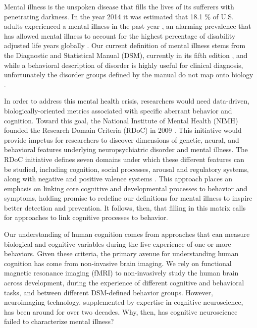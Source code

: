 \documentclass{report}
\begin{document}

Mental illness is the unspoken disease that fills the lives of its sufferers with penetrating darkness. In the year 2014 it was estimated that 18.1 \% of U.S. adults experienced a mental illness in the past year \cite{Samhsa_undated-fo}, an alarming prevalence that has allowed mental illness to account for the highest percentage of disability adjusted life years globally \cite{noauthor_2010-wr}. Our current definition of mental illness stems from the Diagnostic and Statistical Manual (DSM), currently in its fifth edition \cite{american2013diagnostic}, and while a behavioral description of disorder is highly useful for clinical diagnosis, unfortunately the disorder groups defined by the manual do not map onto biology \cite{Cuthbert2013-ks}.

In order to address this mental health crisis, researchers would need data-driven, biologically-oriented metrics associated with specific aberrant behavior and cognition. Toward this goal, the National Institute of Mental Health (NIMH) founded the Research Domain Criteria (RDoC) in 2009 \cite{Insel2009-vi}. This initiative would provide impetus for researchers to discover dimensions of genetic, neural, and behavioral features underlying neuropsychiatric disorder and mental illness. The RDoC initiative defines seven domains under which these different features can be studied, including cognition, social processes, arousal and regulatory systems, along with negative and positive valence systems \cite{Morris2012-hx}. This approach places an emphasis on linking core cognitive and developmental processes to behavior and symptoms, holding promise to redefine our definitions for mental illness to inspire better detection and prevention. It follows, then, that filling in this matrix calls for approaches to link cognitive processes to behavior.

Our understanding of human cognition comes from approaches that can measure biological and cognitive variables during the live experience of one or more behaviors. Given these criteria, the primary avenue for understanding human cognition has come from non-invasive brain imaging. We rely on functional magnetic resonance imaging (fMRI) to non-invasively study the human brain across development, during the experience of different cognitive and behavioral tasks, and between different DSM-defined behavior groups. However, neuroimaging technology, supplemented by expertise in cognitive neuroscience, has been around for over two decades. Why, then, has cognitive neuroscience failed to characterize mental illness?
\end{document}
